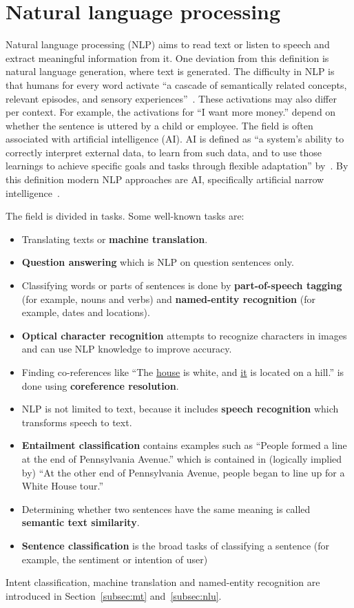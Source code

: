 \section{Natural language processing}
\label{sec:nlp}

Natural language processing (NLP) aims to read text or listen to speech and extract meaningful information from it.
One deviation from this definition is natural language generation, where text is generated.
The difficulty in NLP is that humans for every word activate ``a cascade of semantically related concepts, relevant episodes, and sensory experiences''~\citep{cambria2014jumping}.
These activations may also differ per context.
For example, the activations for ``I want more money.'' depend on whether the sentence is uttered by a child or employee.
The field is often associated with artificial intelligence (AI).
AI is defined as ``a system's ability to correctly interpret external data, to learn from such data, and to use those learnings to achieve specific goals and tasks through flexible adaptation'' by~\citep{kaplan2019siri}.
By this definition modern NLP approaches are AI, specifically artificial narrow intelligence~\citep{kaplan2019siri}.

The field is divided in tasks.
Some well-known tasks are:
\begin{itemize}
    \item Translating texts or \textbf{machine translation}.
    \item \textbf{Question answering} which is NLP on question sentences only.
    \item Classifying words or parts of sentences is done by \textbf{part-of-speech tagging} (for example, nouns and verbs) and \textbf{named-entity recognition} (for example, dates and locations).
    \item \textbf{Optical character recognition} attempts to recognize characters in images and can use NLP knowledge to improve accuracy.
    \item Finding co-references like ``The \underline{house} is white, and \underline{it} is located on a hill.'' is done using \textbf{coreference resolution}.
    \item NLP is not limited to text, because it includes \textbf{speech recognition} which transforms speech to text.
    \item \textbf{Entailment classification} contains examples such as ``People formed a line at the end of Pennsylvania Avenue.'' which is contained in (logically implied by) ``At the other end of Pennsylvania Avenue, people began to line up for a White House tour.''~\cite{williams2018}
    \item Determining whether two sentences have the same meaning is called \textbf{semantic text similarity}.
    \item \textbf{Sentence classification} is the broad tasks of classifying a sentence (for example, the sentiment or intention of user)
\end{itemize}
Intent classification, machine translation and named-entity recognition are introduced in Section~\ref{subsec:mt} and~\ref{subsec:nlu}.

